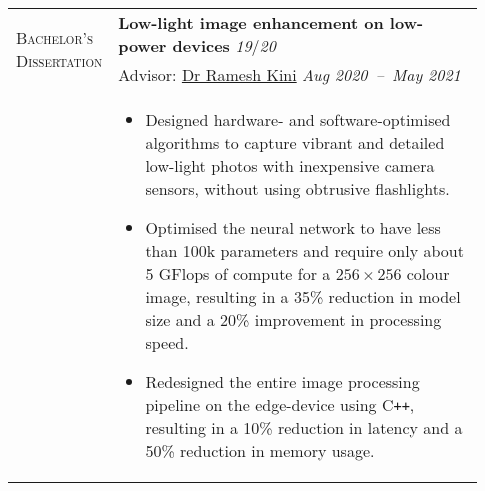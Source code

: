 \documentclass[letterpaper, 10pt, oneside]{article}
\newcommand{\stitle}[1]{\normalsize{\textsc{#1}}}
\newcommand{\bdit}[1]{{\textbf{#1}}}
\begin{document}
\begin{longtable}{@{} p{0.13\linewidth} p{0.8\linewidth}}
    \multirow{2}{6.5em}{\stitle{Bachelor's Dissertation}}   & \bdit{Low-light image enhancement on low-power devices} \hfill \textsl{19}/\textsl{20}                                                                                                                \\
                                                      & Advisor: \href{https://ece.nitk.ac.in/faculty/ramesh-kini-m}{Dr Ramesh Kini} \hfill \textsl{Aug 2020\ --\ May 2021}                                                                                   \\
                                                      & \parbox{0.8\textwidth}{                                                                                                                                                                               %
                \begin{itemize}[leftmargin=*, itemsep=-0.70ex, topsep=-0.88ex]
            \item Designed hardware- and software-optimised algorithms to capture vibrant and detailed low-light photos with inexpensive camera sensors, without using obtrusive flashlights.
            \item Optimised the neural network to have less than 100k parameters and require only about 5 GFlops of compute for a $256 \times 256$ colour image, resulting in a 35\% reduction in model size and a 20\% improvement in processing speed.
            \item Redesigned the entire image processing pipeline on the edge-device using C\texttt{++}, resulting in a 10\% reduction in latency and a 50\% reduction in memory usage.
        \end{itemize}
    }
    \\
    \\


\end{longtable}
\end{document}
